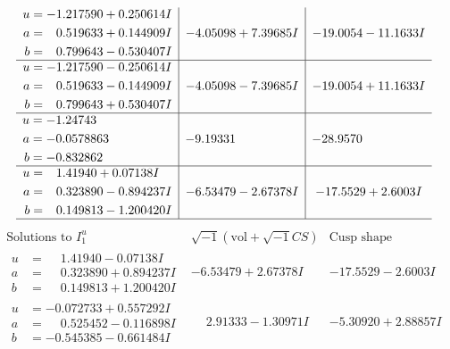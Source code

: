\documentclass[1p]{elsarticle_modified}
\theoremstyle{definition}
\newcommand{\I}{\sqrt{-1}}
\begin{document}
$$\begin{array}{c|c|c}
\begin{aligned}
u &= -1.217590 + 0.250614 I \\
a &= \phantom{-}0.519633 + 0.144909 I \\
b &= \phantom{-}0.799643 - 0.530407 I\end{aligned}
 & -4.05098 + 7.39685 I & -19.0054 - 11.1633 I \\ \hline\begin{aligned}
u &= -1.217590 - 0.250614 I \\
a &= \phantom{-}0.519633 - 0.144909 I \\
b &= \phantom{-}0.799643 + 0.530407 I\end{aligned}
 & -4.05098 - 7.39685 I & -19.0054 + 11.1633 I \\ \hline\begin{aligned}
u &= -1.24743\phantom{ +0.000000I} \\
a &= -0.0578863\phantom{ +0.000000I} \\
b &= -0.832862\phantom{ +0.000000I}\end{aligned}
 & -9.19331\phantom{ +0.000000I} & -28.9570\phantom{ +0.000000I} \\ \hline\begin{aligned}
u &= \phantom{-}1.41940 + 0.07138 I \\
a &= \phantom{-}0.323890 - 0.894237 I \\
b &= \phantom{-}0.149813 - 1.200420 I\end{aligned}
 & -6.53479 - 2.67378 I & -17.5529 + 2.6003 I\\
 \hline 
 \end{array}$$\newpage$$\begin{array}{c|c|c}  
\text{Solutions to }I^u_{1}& \I (\text{vol} + \sqrt{-1}CS) & \text{Cusp shape}\\
 \hline 
\begin{aligned}
u &= \phantom{-}1.41940 - 0.07138 I \\
a &= \phantom{-}0.323890 + 0.894237 I \\
b &= \phantom{-}0.149813 + 1.200420 I\end{aligned}
 & -6.53479 + 2.67378 I & -17.5529 - 2.6003 I \\ \hline\begin{aligned}
u &= -0.072733 + 0.557292 I \\
a &= \phantom{-}0.525452 - 0.116898 I \\
b &= -0.545385 - 0.661484 I\end{aligned}
 & \phantom{-}2.91333 - 1.30971 I & -5.30920 + 2.88857 I \\ \hline\begin{aligned}

\end{aligned}
\end{array}$$
\end{document}
